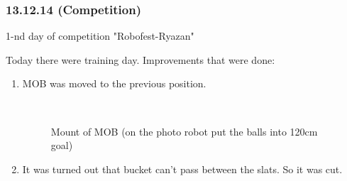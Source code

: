 \subsubsection{13.12.14 (Competition)}
\begin{center}
	1-nd day of competition "Robofest-Ryazan"
\end{center}
Today there were training day.
Improvements that were done:
\begin{enumerate}
	\item MOB was moved to the previous position. 
	
		\begin{figure}[H]
			\begin{minipage}[h]{0.2\linewidth}
				\center  
			\end{minipage}
			\begin{minipage}[h]{0.6\linewidth}
				\caption{Mount of MOB (on the photo robot put the balls into 120cm goal)}
			\end{minipage}
		\end{figure}
	\item It was turned out that bucket can't pass between the slats. So it was cut.
	

\end{enumerate}
